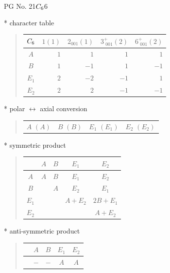 \documentclass[fleqn,8pt,landscape]{jsarticle}
\begin{document}
\setcounter{MaxMatrixCols}{32}

\renewcommand{\tablename}{Table~}
\renewcommand{\figurename}{Figure~}
\begin{center}
\LARGE
PG No. 21\quad$C_{\rm 6}$\quad$6$\quad[ hexagonal ]
\end{center}

* character table
\begin{quote}
\begin{tabular}{crrrr} \hline \hline
$ C_{\rm 6} $ & $ 1(1) $ & $ 2{}_{001}(1) $ & $ 3^{+}_{\,\,001}(2) $ & $ 6^{+}_{\,\,001}(2) $ \\ \hline
$ A $ & $ 1 $ & $ 1 $ & $ 1 $ & $ 1 $ \\
$ B $ & $ 1 $ & $ -1 $ & $ 1 $ & $ -1 $ \\
$ E_{1} $ & $ 2 $ & $ -2 $ & $ -1 $ & $ 1 $ \\
$ E_{2} $ & $ 2 $ & $ 2 $ & $ -1 $ & $ -1 $ \\
 \hline \hline
\end{tabular}
\end{quote}

* polar $\leftrightarrow$ axial conversion
\begin{quote}
\begin{tabular}{cccc}
$ A\,\,(A) $ & $ B\,\,(B) $ & $ E_{1}\,\,(E_{1}) $ & $ E_{2}\,\,(E_{2}) $
\end{tabular}
\end{quote}

* symmetric product
\begin{quote}
\begin{tabular}{c|cccc} \hline \hline
 & $ A $ & $ B $ & $ E_{1} $ & $ E_{2} $ \\ \hline
$ A $ & $ A $ & $ B $ & $ E_{1} $ & $ E_{2} $ \\
$ B $ & $  $ & $ A $ & $ E_{2} $ & $ E_{1} $ \\
$ E_{1} $ & $  $ & $  $ & $ A + E_{2} $ & $ 2 B + E_{1} $ \\
$ E_{2} $ & $  $ & $  $ & $  $ & $ A + E_{2} $ \\
 \hline \hline
\end{tabular}
\end{quote}

* anti-symmetric product
\begin{quote}
\begin{tabular}{ccccc} \hline \hline
 & $ A $ & $ B $ & $ E_{1} $ & $ E_{2} $ \\ \hline
$  $ & $ - $ & $ - $ & $ A $ & $ A $ \\
 \hline \hline
\end{tabular}
\end{quote}
\end{document}
